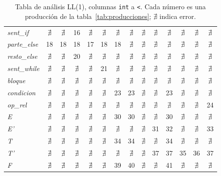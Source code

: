\documentclass[12pt]{article}
\newcommand{\nt}[1]{\textit{#1}}
\begin{document}
\begin{table}[p]
\begin{tabular}{@{}l*{13}{c}@{}}
\nt{sent\_if} & $\nexists$ & $\nexists$ & 16 & $\nexists$ & $\nexists$ & $\nexists$ & $\nexists$ & $\nexists$ & $\nexists$ & $\nexists$ & $\nexists$ & $\nexists$ & $\nexists$ \\
\nt{parte\_else} & 18 & 18 & 18 & 17 & 18 & 18 & $\nexists$ & $\nexists$ & $\nexists$ & $\nexists$ & $\nexists$ & $\nexists$ & $\nexists$ \\
\nt{resto\_else} & $\nexists$ & $\nexists$ & 20 & $\nexists$ & $\nexists$ & $\nexists$ & $\nexists$ & $\nexists$ & $\nexists$ & $\nexists$ & $\nexists$ & $\nexists$ & $\nexists$ \\
\nt{sent\_while} & $\nexists$ & $\nexists$ & $\nexists$ & $\nexists$ & 21 & $\nexists$ & $\nexists$ & $\nexists$ & $\nexists$ & $\nexists$ & $\nexists$ & $\nexists$ & $\nexists$ \\
\nt{bloque} & $\nexists$ & $\nexists$ & $\nexists$ & $\nexists$ & $\nexists$ & $\nexists$ & $\nexists$ & $\nexists$ & $\nexists$ & $\nexists$ & $\nexists$ & $\nexists$ & $\nexists$ \\
\nt{condicion} & $\nexists$ & $\nexists$ & $\nexists$ & $\nexists$ & $\nexists$ & 23 & 23 & $\nexists$ & $\nexists$ & 23 & $\nexists$ & $\nexists$ & $\nexists$ \\
\nt{op\_rel} & $\nexists$ & $\nexists$ & $\nexists$ & $\nexists$ & $\nexists$ & $\nexists$ & $\nexists$ & $\nexists$ & $\nexists$ & $\nexists$ & $\nexists$ & $\nexists$ & 24 \\
\nt{E} & $\nexists$ & $\nexists$ & $\nexists$ & $\nexists$ & $\nexists$ & 30 & 30 & $\nexists$ & $\nexists$ & 30 & $\nexists$ & $\nexists$ & $\nexists$ \\
\nt{E'} & $\nexists$ & $\nexists$ & $\nexists$ & $\nexists$ & $\nexists$ & $\nexists$ & $\nexists$ & $\nexists$ & 31 & 32 & $\nexists$ & $\nexists$ & 33 \\
\nt{T} & $\nexists$ & $\nexists$ & $\nexists$ & $\nexists$ & $\nexists$ & 34 & 34 & $\nexists$ & $\nexists$ & 34 & $\nexists$ & $\nexists$ & $\nexists$ \\
\nt{T'} & $\nexists$ & $\nexists$ & $\nexists$ & $\nexists$ & $\nexists$ & $\nexists$ & $\nexists$ & $\nexists$ & 37 & 37 & 35 & 36 & 37 \\
\nt{F} & $\nexists$ & $\nexists$ & $\nexists$ & $\nexists$ & $\nexists$ & 39 & 40 & $\nexists$ & $\nexists$ & 41 & $\nexists$ & $\nexists$ & $\nexists$ \\
\bottomrule
\end{tabular}
\caption{Tabla de análisis LL(1), columnas \texttt{int} a \texttt{<}. Cada número es una producción de la tabla~\ref{tab:producciones}; $\nexists$ indica error.}
\label{tab:matriz}


\end{table}
\end{document}
